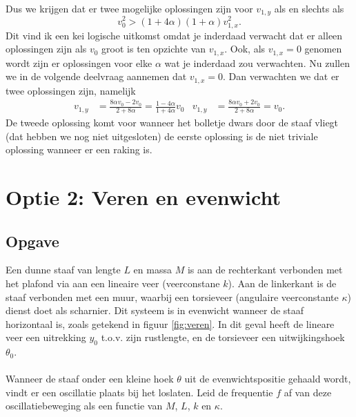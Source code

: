 \documentclass[a4paper,11pt]{article}
\begin{document}
Dus we krijgen dat er twee mogelijke oplossingen zijn voor $v_{1,y}$ als en slechts als
\begin{equation}
	v_0^2>(1+4\alpha)(1+\alpha)v_{1,x}^2.
\end{equation}
Dit vind ik een kei logische uitkomst omdat je inderdaad verwacht dat er alleen oplossingen zijn als $v_0$ groot is ten opzichte van $v_{1,x}$. Ook, als $v_{1,x}=0$ genomen wordt zijn er oplossingen voor elke $\alpha$ wat je inderdaad zou verwachten. Nu zullen we in de volgende deelvraag aannemen dat $v_{1,x}=0$. Dan verwachten we dat er twee oplossingen zijn, namelijk
\begin{align}
	v_{1,y}&=\frac{8\alpha v_0-2v_0}{2+8\alpha}=\frac{1-4\alpha}{1+4\alpha}v_0&v_{1,y}&=\frac{8\alpha v_0+2v_0}{2+8\alpha}=v_0.
\end{align}
De tweede oplossing komt voor wanneer het bolletje dwars door de staaf vliegt (dat hebben we nog niet uitgesloten) de eerste oplossing is de niet triviale oplossing wanneer er een raking is.
\newpage 
\section*{Optie 2: Veren en evenwicht}
\subsection*{Opgave}
Een dunne staaf van lengte $L$ en massa $M$ is aan de rechterkant verbonden met het plafond via aan een lineaire veer (veerconstane $k$). Aan de linkerkant is de staaf verbonden met een muur, waarbij een torsieveer (angulaire veerconstante $\kappa$) dienst doet als scharnier. Dit systeem is in evenwicht wanneer de staaf horizontaal is, zoals getekend in figuur \ref{fig:veren}. In dit geval heeft de lineare veer een uitrekking $y_0$ t.o.v. zijn rustlengte, en de torsieveer een uitwijkingshoek $\theta_0$. 
\\ \\
Wanneer de staaf onder een kleine hoek $\theta$ uit de evenwichtspositie gehaald wordt, vindt er een oscillatie plaats bij het loslaten. Leid de frequentie $f$ af van deze oscillatiebeweging als een functie van $M$, $L$, $k$ en $\kappa$.
\end{document}
